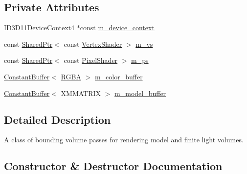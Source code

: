 \subsection*{Private Attributes}
\begin{DoxyCompactItemize}
\item 
I\+D3\+D11\+Device\+Context4 $\ast$const \hyperlink{classmage_1_1_bounding_volume_pass_a4ee95284ca70becba75d4be1a19268d7}{m\+\_\+device\+\_\+context}
\item 
const \hyperlink{namespacemage_a1e01ae66713838a7a67d30e44c67703e}{Shared\+Ptr}$<$ const \hyperlink{classmage_1_1_vertex_shader}{Vertex\+Shader} $>$ \hyperlink{classmage_1_1_bounding_volume_pass_aa10e1d4cc354b9b0d41789f453ea9cde}{m\+\_\+vs}
\item 
const \hyperlink{namespacemage_a1e01ae66713838a7a67d30e44c67703e}{Shared\+Ptr}$<$ const \hyperlink{namespacemage_a27ecaf266420ee7a494d64edc0757129}{Pixel\+Shader} $>$ \hyperlink{classmage_1_1_bounding_volume_pass_a30c85c0e4766e4e330d906af2ecc7463}{m\+\_\+ps}
\item 
\hyperlink{structmage_1_1_constant_buffer}{Constant\+Buffer}$<$ \hyperlink{structmage_1_1_r_g_b_a}{R\+G\+BA} $>$ \hyperlink{classmage_1_1_bounding_volume_pass_aeb60ac6a87ba6fdd6a87fb750e2f3d10}{m\+\_\+color\+\_\+buffer}
\item 
\hyperlink{structmage_1_1_constant_buffer}{Constant\+Buffer}$<$ X\+M\+M\+A\+T\+R\+IX $>$ \hyperlink{classmage_1_1_bounding_volume_pass_a07df0f32726f390dd0f060bc6d61b40e}{m\+\_\+model\+\_\+buffer}
\end{DoxyCompactItemize}


\subsection{Detailed Description}
A class of bounding volume passes for rendering model and finite light volumes. 

\subsection{Constructor \& Destructor Documentation}
\hypertarget{classmage_1_1_bounding_volume_pass_ab32eb9086e463f5260f8999b78b55b26}{}\label{classmage_1_1_bounding_volume_pass_ab32eb9086e463f5260f8999b78b55b26} 
